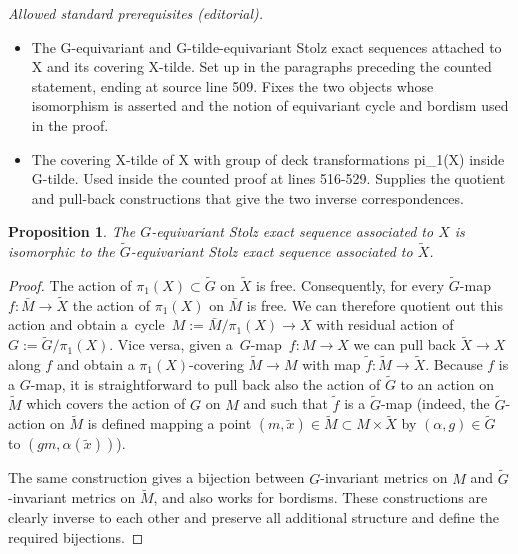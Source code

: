 \documentclass[10pt,a4paper]{amsart}
\newtheorem{Proposition}[Theorem]{Proposition}
{ \theoremstyle{definition}
	\newtheorem{Definition}[Theorem]{Definition}
	\newtheorem{Note}[Theorem]{Note}
	\newtheorem{Example}[Theorem]{Example}
	\newtheorem{Remark}[Theorem]{Remark} }
\begin{document}
\noindent\textit{Allowed standard prerequisites (editorial).}\begin{itemize}
\item The G-equivariant and G-tilde-equivariant Stolz exact sequences attached to X and its covering X-tilde. Set up in the paragraphs preceding the counted statement, ending at source line 509. Fixes the two objects whose isomorphism is asserted and the notion of equivariant cycle and bordism used in the proof.
\item The covering X-tilde of X with group of deck transformations pi\_1(X) inside G-tilde. Used inside the counted proof at lines 516-529. Supplies the quotient and pull-back constructions that give the two inverse correspondences.
\end{itemize}\medskip
	\begin{Proposition}\label{extension}
		The $G$-equivariant Stolz exact sequence associated to $X$ is isomorphic to
		the $\widetilde{G}$-equivariant Stolz exact sequence associated to
		$\tilde{X}$.
	\end{Proposition}

	\begin{proof}
		The action of $\pi_1(X)\subset \widetilde{G}$ on $\tilde X$ is
		free. Consequently, for every $\widetilde{G}$-map ${f\colon \bar M\to\tilde X}$ the
		action of $\pi_1(X)$ on $\bar M$ is free. We can therefore quotient out this
		action and obtain a~cycle~${M:=\bar M/\pi_1(X)\to X}$ with residual action of
		$G:=\widetilde{G}/\pi_1(X)$.
		Vice versa, given a~$G$-map~${f\colon M\to X}$ we can pull back $\tilde X\to
		X$ along $f$ and obtain a $\pi_1(X)$-covering $\tilde M\to M$ with map
		$\tilde f\colon \tilde M\to \tilde X$. Because $f$ is a $G$-map, it is
		straightforward to pull back
		also the action of $\widetilde{G}$ to an action on $\tilde M$ which covers
		the action of $G$ on $M$ and such that $\tilde f$ is a $\widetilde{G}$-map
		(indeed, the $\widetilde{G}$-action on $\tilde M$ is defined mapping a point
		$(m,\tilde x)\in \tilde M\subset M\times \tilde X$ by
		$(\alpha,g)\in\widetilde{G}$ to $(gm,\alpha(\tilde x))$).
		
		The same construction gives a bijection between $G$-invariant metrics on $M$
		and $\widetilde{G}$-invariant metrics on $\tilde M$, and also works for
		bordisms.
		These constructions are clearly inverse to each other and preserve all
		additional structure and define the required bijections.
	\end{proof}
\end{document}
